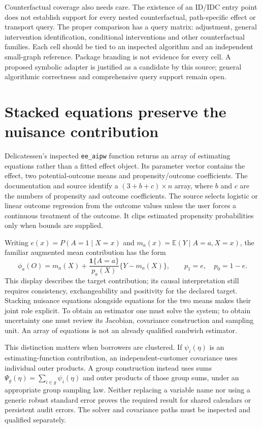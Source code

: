 Counterfactual coverage also needs care. The existence of an ID/IDC entry point
does not establish support for every nested counterfactual, path-specific effect
or transport query. The proper comparison has a query matrix: adjustment,
general intervention identification, conditional interventions and other
counterfactual families. Each cell should be tied to an inspected algorithm and
an independent small-graph reference. Package branding is not evidence for every
cell. A proposed symbolic adapter is justified as a candidate by this source;
general algorithmic correctness and comprehensive query support remain open.

\section{Stacked equations preserve the nuisance contribution}

Delicatessen's inspected \texttt{ee\_aipw} function returns an array of estimating
equations rather than a fitted effect object. Its parameter vector contains the
effect, two potential-outcome means and propensity/outcome coefficients. The
documentation and source identify a $(3+b+c)\times n$ array, where $b$ and $c$
are the numbers of propensity and outcome coefficients. The source selects
logistic or linear outcome regression from the outcome values unless the user
forces a continuous treatment of the outcome. It clips estimated propensity
probabilities only when bounds are supplied. \citep{v13_sw_delicatessen}

Writing $e(x)=P(A=1\mid X=x)$ and $m_a(x)=\mathbb E(Y\mid A=a,X=x)$, the
familiar augmented mean contribution has the form
\[
 \phi_a(O)=m_a(X)+\frac{\mathbf 1\{A=a\}}{p_a(X)}
                   \{Y-m_a(X)\},
 \qquad p_1=e,\quad p_0=1-e.
\]
This display describes the target contribution; its causal interpretation still
requires consistency, exchangeability and positivity for the declared target.
Stacking nuisance equations alongside equations for the two means makes their
joint role explicit. To obtain an estimator one must solve the system; to obtain
uncertainty one must review its Jacobian, covariance construction and sampling
unit. An array of equations is not an already qualified sandwich estimator.

This distinction matters when borrowers are clustered. If $\psi_i(\eta)$ is
an estimating-function contribution, an independent-customer covariance uses
individual outer products. A group construction instead uses sums
$\Psi_g(\eta)=\sum_{i\in g}\psi_i(\eta)$ and outer products of those group
sums, under an appropriate group sampling law. Neither replacing a variable
name nor using a generic robust standard error proves the required result for
shared calendars or persistent audit errors. The solver and covariance paths
must be inspected and qualified separately.

